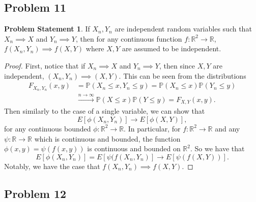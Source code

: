 \documentclass[12pt,reqno]{article}
\theoremstyle{plain}
\theoremstyle{definition}
\newtheorem{problem}[theorem]{Problem Statement}
\newcommand{\PP}[1]{\ensuremath{\mathbb{P}\left(#1\right)}}
\begin{document}
\subsection{Problem 11}

\begin{problem}
If $X_n,Y_n$ are independent random variables such that $X_n \implies X$ 
and $Y_n \implies Y$, then for any continuous function 
$f:\mathbb{R}^2 \rightarrow \mathbb{R}$, $f(X_n,Y_n) \implies f(X,Y)$ 
where $X,Y$ are assumed to be independent. 
\end{problem}
\begin{proof}
First, notice that if $X_n \implies X$ and $Y_n \implies Y$, then since 
$X,Y$ are independent, $(X_n, Y_n) \implies (X, Y)$. This can be seen from 
the distributions 
\begin{align*} 
F_{X_n,Y_n}(x, y) & = \PP{X_n \leq x, Y_n \leq y} = 
    \PP{X_n \leq x} \PP{Y_n \leq y} \\ 
    & \xrightarrow{n \rightarrow \infty}{} \PP{X \leq x} \PP{Y \leq y} = 
    F_{X,Y}(x, y).
\end{align*} 
Then similarly to the case of a single variable, we can show that 
\[
E[\phi(X_n, Y_n)] \rightarrow E[\phi(X, Y)], 
\]
for any continuous bounded $\phi: \mathbb{R}^2 \rightarrow \mathbb{R}$. 
In particular, for $f: \mathbb{R}^2 \rightarrow \mathbb{R}$ and any 
$\psi: \mathbb{R} \rightarrow \mathbb{R}$ which is continuous and bounded, 
the function $\phi(x, y) = \psi(f(x, y))$ is continuous and bounded on 
$\mathbb{R}^2$. So we have that 
\[
E[\phi(X_n, Y_n)] = E[\psi(f(X_n, Y_n)] \rightarrow E[\psi(f(X, Y))]. 
\]
Notably, we have the case that $f(X_n, Y_n) \implies f(X, Y)$.  
\end{proof} 

\subsection{Problem 12}
\end{document}
